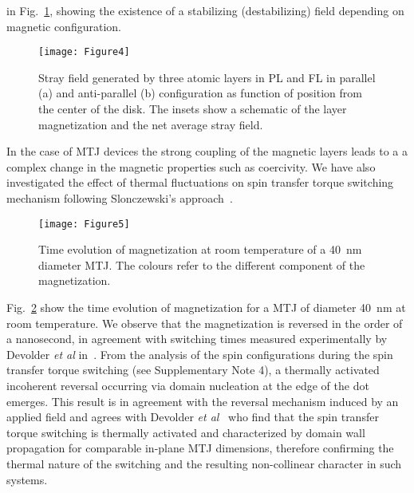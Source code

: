 \documentclass[aps,prb,signlecolumn,preprint,superscriptaddress,10]{revtex4-1}
\begin{document}
in Fig.~\ref{fig:MTJ_strayfield}, showing the existence of a stabilizing (destabilizing) field depending on magnetic configuration.
%
\begin{figure}[!tb]
	\centering
	\texttt{[image: Figure4]}
	\caption{Stray field generated by three atomic layers in PL and FL in parallel (a) and anti-parallel (b) configuration as function of position from the center of the disk. The insets show a schematic of the layer magnetization and the net average stray field.}
	\label{fig:MTJ_strayfield}
\end{figure}
% 
In the case of MTJ devices the strong coupling of the magnetic layers leads to a a complex change in the magnetic properties such as coercivity.
We have also investigated the effect of thermal fluctuations on spin transfer torque switching mechanism following Slonczewski's approach~\cite{Slonczewski1996}. 
%
\begin{figure}[!tb]
	\centering
	\texttt{[image: Figure5]}
	\caption{Time evolution of magnetization at room temperature of a 40~nm diameter MTJ. The colours refer to the different component of the magnetization.}
	\label{fig:STT-time-evol}
\end{figure}
%
Fig.~\ref{fig:STT-time-evol} show the time evolution of magnetization for a MTJ of diameter 40~nm at room temperature. We observe that the magnetization is reversed in the order of a nanosecond, in agreement with switching times measured experimentally by Devolder \textit{et al} in~\cite{Devolderjan2016}. From the analysis of the spin configurations during the spin transfer torque switching (see Supplementary Note 4), a thermally activated incoherent reversal occurring via domain nucleation at the edge of the dot emerges. This result is in agreement with the reversal mechanism induced by an applied field and agrees with Devolder \textit{et al}~\cite{DevolderJune2016} who find that the spin transfer torque switching is thermally activated and characterized by domain wall propagation for comparable in-plane MTJ dimensions, therefore confirming the thermal nature of the switching and the resulting non-collinear character in such systems.
\end{document}
